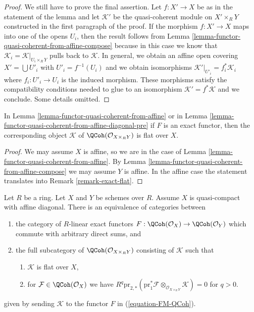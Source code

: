 \begin{proof}
\medskip\noindent
We still have to prove the final assertion. Let $f : X' \to X$
be as in the statement of the lemma and let $\mathcal{K}'$
be the quasi-coherent module on $X' \times_R Y$ constructed
in the first paragraph of the proof. If the morphism
$f : X' \to X$ maps into one of the opens $U_i$, then the
result follows from
Lemma \ref{lemma-functor-quasi-coherent-from-affine-compose}
because in this case we know
that $\mathcal{K}_i = \mathcal{K}|_{U_i \times_R Y}$
pulls back to $\mathcal{K}$. In general, we obtain an
affine open covering $X' = \bigcup U'_i$ with $U'_i = f^{-1}(U_i)$
and we obtain isomorphisms
$\mathcal{K}'|_{U'_i} = f_i^*\mathcal{K}_i$ where
$f_i : U'_i \to U_i$ is the induced morphism.
These morphisms satisfy the compatibility conditions needed
to glue to an isomorphism $\mathcal{K}' = f^*\mathcal{K}$
and we conclude. Some details omitted.
\end{proof}

\begin{lemma}
\label{lemma-coh-noetherian-from-affine-flat}
In Lemma \ref{lemma-functor-quasi-coherent-from-affine}
or in Lemma \ref{lemma-functor-quasi-coherent-from-affine-diagonal-pre}
if $F$ is an exact functor, then the corresponding object
$\mathcal{K}$ of $\QCoh(\mathcal{O}_{X \times_R Y})$ is flat over $X$.
\end{lemma}

\begin{proof}
We may assume $X$ is affine, so we are in the case of
Lemma \ref{lemma-functor-quasi-coherent-from-affine}.
By Lemma \ref{lemma-functor-quasi-coherent-from-affine-compose}
we may assume $Y$ is affine. In the affine case the statement
translates into Remark \ref{remark-exact-flat}.
\end{proof}

\begin{lemma}
\label{lemma-functor-quasi-coherent-from-affine-diagonal}
Let $R$ be a ring. Let $X$ and $Y$ be schemes over $R$. Assume $X$ is
quasi-compact with affine diagonal.
There is an equivalence of categories between
\begin{enumerate}
\item the category of $R$-linear exact functors
$F : \QCoh(\mathcal{O}_X) \to \QCoh(\mathcal{O}_Y)$
which commute with arbitrary direct sums, and
\item the full subcategory of $\QCoh(\mathcal{O}_{X \times_R Y})$ consisting
of $\mathcal{K}$ such that
\begin{enumerate}
\item $\mathcal{K}$ is flat over $X$,
\item for $\mathcal{F} \in \QCoh(\mathcal{O}_X)$ we have
$R^q\text{pr}_{2, *}(\text{pr}_1^*\mathcal{F}
\otimes_{\mathcal{O}_{X \times_R Y}} \mathcal{K}) = 0$ for $q > 0$.
\end{enumerate}
\end{enumerate}
given by sending $\mathcal{K}$ to the functor $F$ in (\ref{equation-FM-QCoh}).
\end{lemma}

